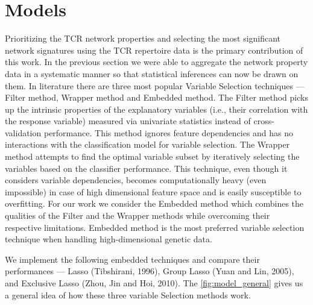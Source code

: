 \section{Models}\label{sec:models}
Prioritizing the TCR network properties and selecting the most significant network signatures using the TCR repertoire data is the primary contribution of this work. In the previous section we were able to aggregate the network property data in a systematic manner so that statistical inferences can now be drawn on them. In literature there are three most popular Variable Selection techniques --- Filter method, Wrapper method and Embedded method. The Filter method picks up the intrinsic properties of the explanatory variables (i.e., their correlation with the response variable) measured via univariate statistics instead of cross-validation performance. This method ignores feature dependencies and has no interactions with the classification model for variable selection. The Wrapper method attempts to find the optimal variable subset by iteratively selecting the variables based on the classifier performance. This technique, even though it considers variable dependencies, becomes computationally heavy (even impossible) in case of high dimensional feature space and is easily susceptible to overfitting. For our work we consider the Embedded method which combines the qualities of the Filter and the Wrapper methods while overcoming their respective limitations. Embedded method is the most preferred variable selection technique when handling high-dimensional genetic data.\par
We implement the following embedded techniques and compare their performances --- Lasso (\cite{tibshir}Tibshirani, 1996), Group Lasso (\cite{grouporigin}Yuan and Lin, 2005), and Exclusive Lasso (\cite{exclusv_lasso}Zhou, Jin and Hoi, 2010). The \autoref{fig:model_general} gives us a general idea of how these three variable Selection methods work.\par

